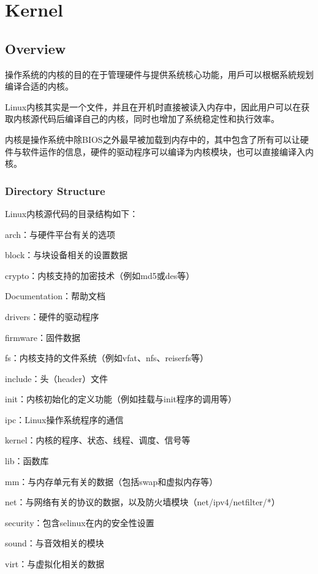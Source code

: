 \part{Kernel}

\chapter{Overview}

操作系统的内核的目的在于管理硬件与提供系统核心功能，用戶可以根椐系統规划编译合适的内核。




Linux内核其实是一个文件，并且在开机时直接被读入内存中，因此用户可以在获取内核源代码后编译自己的内核，同时也增加了系统稳定性和执行效率。

内核是操作系统中除BIOS之外最早被加载到内存中的，其中包含了所有可以让硬件与软件运作的信息，硬件的驱动程序可以编译为内核模块，也可以直接编译入内核。


\section{Directory Structure}


Linux内核源代码的目录结构如下：

\begin{compactitem}
\item arch：与硬件平台有关的选项
\item block：与块设备相关的设置数据
\item crypto：内核支持的加密技术（例如md5或des等）
\item Documentation：帮助文档
\item drivers：硬件的驱动程序
\item firmware：固件数据
\item fs：内核支持的文件系统（例如vfat、nfs、reiserfs等）
\item include：头（header）文件
\item init：内核初始化的定义功能（例如挂载与init程序的调用等）
\item ipc：Linux操作系统程序的通信
\item kernel：内核的程序、状态、线程、调度、信号等
\item lib：函数库
\item mm：与内存单元有关的数据（包括swap和虚拟内存等）
\item net：与网络有关的协议的数据，以及防火墙模块（net/ipv4/netfilter/*）
\item security：包含selinux在内的安全性设置
\item sound：与音效相关的模块
\item virt：与虚拟化相关的数据
\end{compactitem}

